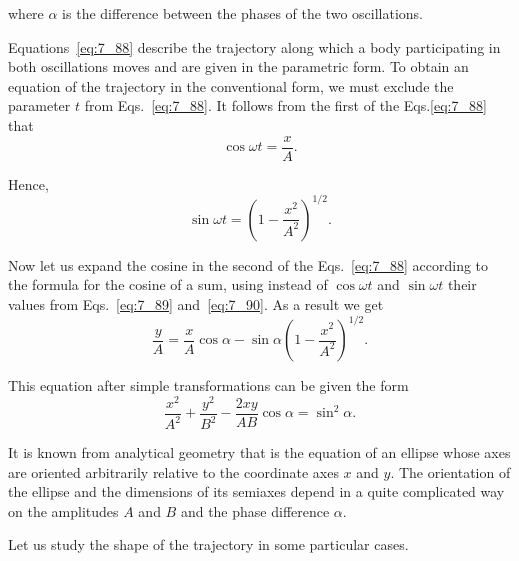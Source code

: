 \noindent
where $\alpha$ is the difference between the phases of the two oscillations.

Equations~\eqref{eq:7_88} describe the trajectory along which a body participating in both oscillations moves and are given in the parametric form. To obtain an equation of the trajectory in the conventional form, we must exclude the parameter $t$ from Eqs.~\eqref{eq:7_88}. It follows from the first of the Eqs.\eqref{eq:7_88} that
\begin{equation}\label{eq:7_89}
	\cos\omega t = \frac{x}{A}.
\end{equation}

\noindent
Hence,
\begin{equation}\label{eq:7_90}
	\sin\omega t = \left(1 - \frac{x^2}{A^2}\right)^{1/2}.
\end{equation}

\noindent
Now let us expand the cosine in the second of the Eqs.~\eqref{eq:7_88} according to the formula for the cosine of a sum, using instead of $\cos\omega t$ and $\sin\omega t$ their values from Eqs.~\eqref{eq:7_89} and~\eqref{eq:7_90}. As a result we get
\begin{equation*}
	\frac{y}{A} = \frac{x}{A}\cos\alpha - \sin\alpha \left(1 - \frac{x^2}{A^2}\right)^{1/2}.
\end{equation*}

\noindent
This equation after simple transformations can be given the form
\begin{equation}\label{eq:7_91}
	\frac{x^2}{A^2} + \frac{y^2}{B^2} - \frac{2xy}{AB} \cos\alpha = \sin^2\alpha.
\end{equation}

It is known from analytical geometry that  is the equation of an ellipse whose axes are oriented arbitrarily relative to the coordinate axes $x$ and $y$. The orientation of the ellipse and the dimensions of its semiaxes depend in a quite complicated way on the amplitudes $A$ and $B$ and the phase difference $\alpha$.

Let us study the shape of the trajectory in some particular cases.

